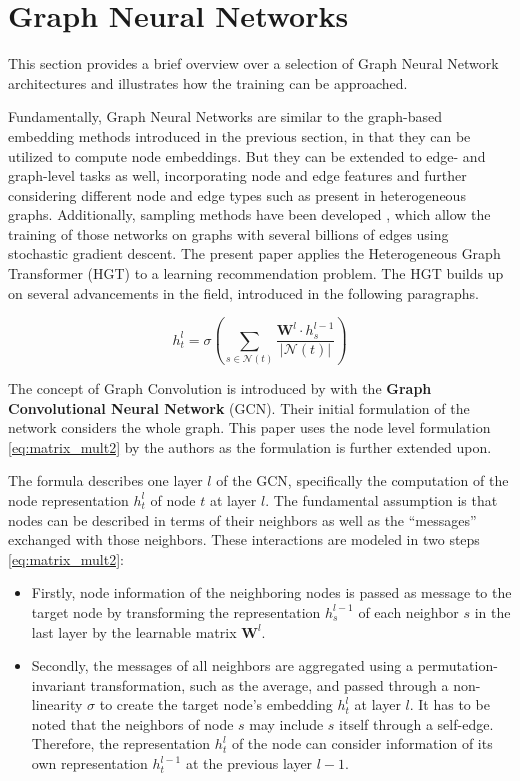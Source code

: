 \section{Graph Neural Networks}
This section provides a brief overview over a selection of Graph Neural Network  architectures and illustrates how the training can be approached. 

Fundamentally, Graph Neural Networks are similar to the graph-based embedding methods introduced in the previous section, in that they can be utilized to compute node embeddings.  But they can be extended to edge- and graph-level tasks as well, incorporating node and edge features  and further considering different node and edge types such as present in heterogeneous graphs. Additionally, sampling methods have been developed \parencite{ying2018graph}, which allow the training of those networks on graphs with several billions of edges  using stochastic gradient descent. 
The present paper applies the Heterogeneous Graph Transformer (HGT) \parencite{hu2020heterogeneous} to a learning recommendation problem. 
The HGT builds up on several advancements in the field, introduced in the following paragraphs.


\begin{equation}
h_t^l = \sigma\left(   \sum_{s \in \mathcal{N}(t)} \frac{\mathbf{W}^l \cdot h_s^{l-1}}{|\mathcal{N}(t)|} \right) \label{eq:matrix_mult2}
\end{equation}

The concept of Graph Convolution is introduced by \textcite{kipf2016semi} with the \textbf{Graph Convolutional Neural Network} (GCN). Their initial formulation of the network considers the whole graph. This paper uses the node level formulation \eqref{eq:matrix_mult2} by the authors as the formulation is further extended upon.


The formula describes one layer $l$ of the GCN, specifically the computation of the node representation $h_t^l$ of node $t$ at layer $l$. The fundamental assumption is that nodes can be described in terms of their neighbors as well as  the “messages” exchanged with those neighbors. These interactions are modeled in two steps \eqref{eq:matrix_mult2}:

\begin{itemize}
\item Firstly, node information of the neighboring nodes is passed as message to the target node by transforming the representation $h_s^{l-1}$ of each neighbor $s$ in the last layer by the learnable matrix $\mathbf{W}^l$. 
\item Secondly, the messages of all neighbors are aggregated using a permutation-invariant transformation, such as the average, and passed through a  non-linearity $\sigma$ to create the target node's embedding $h_t^l$ at layer $l$. It has to be noted that the neighbors of node $s$ may include $s$ itself through a self-edge. Therefore, the representation $h_t^l$  of the node can consider information of its own representation $h_t^{l-1}$ at the previous layer ${l-1}$.
\end{itemize}
 

